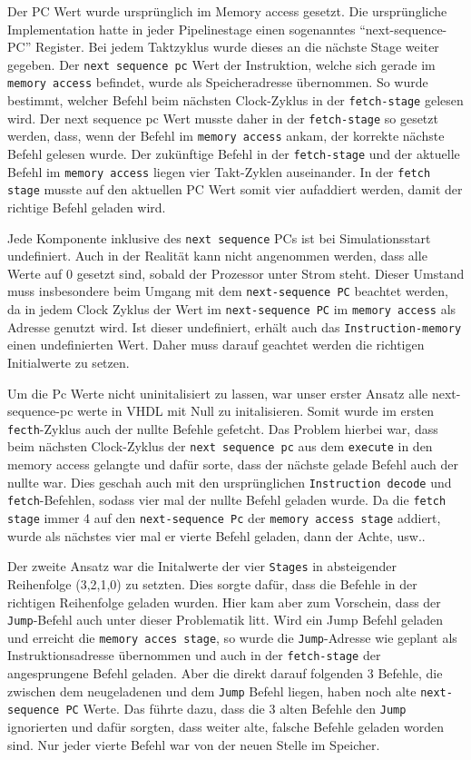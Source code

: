 \documentclass[paper=a4,fontsize=12pt,twocolumn]{scrreprt}
\begin{document}
Der PC Wert wurde ursprünglich im Memory access gesetzt.
Die ursprüngliche Implementation hatte in jeder Pipelinestage einen sogenanntes \enquote{next-sequence-PC} Register.
Bei jedem Taktzyklus wurde dieses an die nächste Stage weiter gegeben.
Der \texttt{next sequence pc} Wert der Instruktion, welche sich gerade im \texttt{memory access} befindet, wurde als Speicheradresse übernommen.
So wurde bestimmt, welcher Befehl beim nächsten Clock-Zyklus in der \texttt{fetch-stage} gelesen wird. 
Der next sequence pc Wert musste daher in der \texttt{fetch-stage} so gesetzt werden, dass, wenn der Befehl im \texttt{memory access} ankam, der korrekte nächste Befehl gelesen wurde. 
Der zukünftige Befehl in der \texttt{fetch-stage} und der aktuelle Befehl im \texttt{memory access} liegen vier Takt-Zyklen auseinander.
In der \texttt{fetch stage} musste auf den aktuellen PC Wert somit vier aufaddiert werden, damit der richtige Befehl geladen wird.

Jede Komponente inklusive des \texttt{next sequence} PCs ist bei Simulationsstart undefiniert.
Auch in der Realität kann nicht angenommen werden, dass alle Werte auf 0 gesetzt sind, sobald der Prozessor unter Strom steht.
Dieser Umstand muss insbesondere beim Umgang mit dem \texttt{next-sequence PC} beachtet werden, da in jedem Clock Zyklus der Wert im \texttt{next-sequence PC} im \texttt{memory access} als Adresse genutzt wird.
Ist dieser undefiniert, erhält auch das \texttt{Instruction-memory} einen undefinierten Wert.
Daher muss darauf geachtet werden  die richtigen Initialwerte zu setzen.

Um die Pc Werte nicht uninitalisiert zu lassen, war unser erster Ansatz alle next-sequence-pc werte in VHDL mit Null zu initalisieren.
Somit wurde im ersten \texttt{fecth}-Zyklus auch der nullte Befehle gefetcht.
Das Problem hierbei war, dass beim nächsten Clock-Zyklus der \texttt{next sequence pc} aus dem \texttt{execute} in den memory access gelangte und dafür sorte, dass der nächste gelade Befehl auch der nullte war. 
Dies geschah auch mit den ursprünglichen \texttt{Instruction decode} und \texttt{fetch}-Befehlen, sodass vier mal der nullte Befehl geladen wurde.
Da die \texttt{fetch stage} immer 4 auf den \texttt{next-sequence Pc} der \texttt{memory access stage} addiert, wurde als nächstes vier mal er vierte Befehl geladen, dann der Achte, usw..

Der zweite Ansatz war die Initalwerte der vier \texttt{Stages} in absteigender Reihenfolge (3,2,1,0) zu setzten.
Dies sorgte dafür, dass die Befehle in der richtigen Reihenfolge geladen wurden.
Hier kam aber zum Vorschein, dass der \texttt{Jump}-Befehl auch unter dieser Problematik litt.
Wird ein Jump Befehl geladen und erreicht die \texttt{memory acces stage}, so wurde die \texttt{Jump}-Adresse wie geplant als Instruktionsadresse übernommen und auch in der \texttt{fetch-stage} der angesprungene Befehl geladen.
Aber die direkt darauf folgenden 3 Befehle, die zwischen dem neugeladenen und dem \texttt{Jump} Befehl liegen, haben noch alte \texttt{next-sequence PC} Werte.
Das führte dazu, dass die 3 alten Befehle den \texttt{Jump} ignorierten und dafür sorgten, dass weiter alte, falsche Befehle geladen worden sind.
Nur jeder vierte Befehl war von der neuen Stelle im Speicher.
\end{document}
